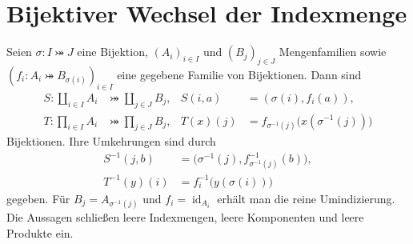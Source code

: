 \section{Bijektiver Wechsel der Indexmenge}

\begin{theorem}
\label{b08guide:thm:reindexing}
Seien $\sigma\colon I\bij J$ eine Bijektion, $(A_i)_{i\in I}$ und
$(B_j)_{j\in J}$ Mengenfamilien sowie
$(f_i\colon A_i\bij B_{\sigma(i)})_{i\in I}$ eine gegebene Familie
von Bijektionen. Dann sind
\[
 \begin{aligned}
 S\colon\coprod_{i\in I}A_i&\bij\coprod_{j\in J}B_j,
 & S(i,a)&=(\sigma(i),f_i(a)),\\
 T\colon\prod_{i\in I}A_i&\bij\prod_{j\in J}B_j,
 & T(x)(j)&=f_{\sigma^{-1}(j)}\bigl(x(\sigma^{-1}(j))\bigr)
 \end{aligned}
\]
Bijektionen. Ihre Umkehrungen sind durch
\[
 \begin{aligned}
 S^{-1}(j,b)
   &=\bigl(\sigma^{-1}(j),f_{\sigma^{-1}(j)}^{-1}(b)\bigr),\\
 T^{-1}(y)(i)&=f_i^{-1}\bigl(y(\sigma(i))\bigr)
 \end{aligned}
\]
gegeben. Für $B_j=A_{\sigma^{-1}(j)}$ und
$f_i=\operatorname{id}_{A_i}$ erhält man die reine Umindizierung.
Die Aussagen schließen leere Indexmengen, leere Komponenten und
leere Produkte ein.
\end{theorem}

